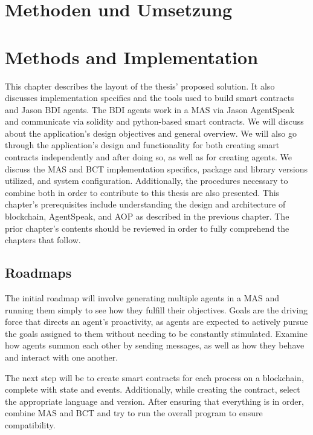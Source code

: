 {\chapter{Methoden und Umsetzung}}
{\chapter{Methods and Implementation}}
\label{sec:methods}


This chapter describes the layout of the thesis' proposed solution. It also discusses implementation specifics and the tools used to build smart contracts and Jason \ac{BDI} agents. The \ac{BDI} agents work in a \ac{MAS} via Jason AgentSpeak and communicate via solidity and python-based smart contracts. We will discuss about the application's design objectives and general overview. We will also go through the application's design and functionality for both creating smart contracts independently and after doing so, as well as for creating agents. We discuss the \ac{MAS} and \ac{BCT} implementation specifics, package and library versions utilized, and system configuration. Additionally, the procedures necessary to combine both in order to contribute to this thesis are also presented. This chapter's prerequisites include understanding the design and architecture of blockchain, AgentSpeak, and \ac{AOP} as described in the previous chapter. The prior chapter's contents should be reviewed in order to fully comprehend the chapters that follow.

\section{Roadmaps}

The initial roadmap will involve generating multiple agents in a \ac{MAS} and running them simply to see how they fulfill their objectives. Goals are the driving force that directs an agent's proactivity, as agents are expected to actively pursue the goals assigned to them without needing to be constantly stimulated. Examine how agents summon each other by sending messages, as well as how they behave and interact with one another. 

\vspace{.5cm}

The next step will be to create smart contracts for each process on a blockchain, complete with state and events. Additionally, while creating the contract, select the appropriate language and version. After ensuring that everything is in order, combine \ac{MAS} and \ac{BCT} and try to run the overall program to ensure compatibility.

